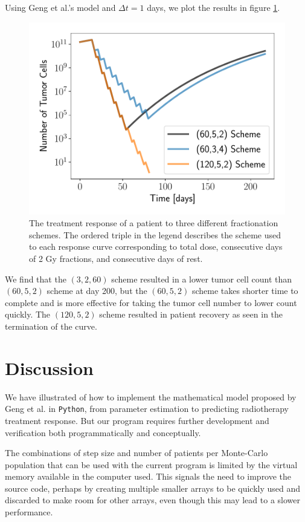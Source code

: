\documentclass[letterpaper
, superscriptaddress
, twocolumn
, aps
]{revtex4}
\begin{document}
Using Geng et al.'s model and $\Delta t = 1$ days, we plot the results in figure \ref{predict}.
\begin{figure}
	\includegraphics[width=1.00\columnwidth]{Figures/prediction.pdf}
	\caption{The treatment response of a patient to three different fractionation schemes. The ordered triple in the legend describes the scheme used to each response curve corresponding to total dose, consecutive days of 2 Gy fractions, and consecutive days of rest.}
	\label{predict}
\end{figure}

We find that the $(3,2,60)$ scheme resulted in a lower tumor cell count than $(60,5,2)$ scheme at day 200, but the $(60,5,2)$ scheme takes shorter time to complete and is more effective for taking the tumor cell number to lower count quickly. The $(120,5,2)$ scheme resulted in patient recovery as seen in the termination of the curve. 

\section{Discussion}

We have illustrated of how to implement the mathematical model proposed by Geng et al. in \texttt{Python}, from parameter estimation to predicting radiotherapy treatment response. But our program requires further development and verification both programmatically and conceptually.

The combinations of step size and number of patients per Monte-Carlo population that can be used with the current program is limited by the virtual memory available in the computer used. This signals the need to improve the source code, perhaps by creating multiple smaller arrays to be quickly used and discarded to make room for other arrays, even though this may lead to a slower performance. 
\end{document}
